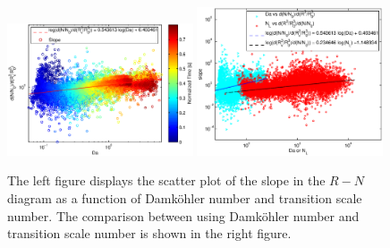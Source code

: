 \begin{figure}[!htbp]\centering
\includegraphics[width=0.49\textwidth]{Figures/slope_da}
\includegraphics[width=0.49\textwidth]{Figures/slope_da_nl}
\caption{The left figure displays the scatter plot of the slope in the $R-N$ diagram as a function 
of Damk\"{o}hler number and transition scale number. The comparison between using Damk\"{o}hler 
number and transition scale number is shown in the right figure.}
\label{fig:slope_da_nl}
\end{figure}

